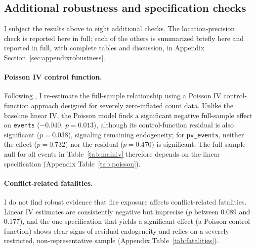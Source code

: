 \documentclass[12pt]{article}
\begin{document}
\subsection{Additional robustness and specification checks}
\label{sec:robustness-summary}

I subject the results above to eight additional checks. The location-precision check is reported here in full; each of the others is summarized briefly here and reported in full, with complete tables and discussion, in Appendix Section~\ref{sec:appendixrobustness}.

\paragraph{Poisson IV control function.} Following \citet{lu2023fish}, I re-estimate the full-sample relationship using a Poisson IV control-function approach \citep{terzabasurathouz2008} designed for severely zero-inflated count data. Unlike the baseline linear IV, the Poisson model finds a significant negative full-sample effect on \texttt{events} ($-0.040$, $p=0.013$), although its control-function residual is also significant ($p=0.038$), signaling remaining endogeneity; for \texttt{pv\_events}, neither the effect ($p=0.732$) nor the residual ($p=0.470$) is significant. The full-sample null for all events in Table~\ref{tab:mainiv} therefore depends on the linear specification (Appendix Table~\ref{tab:poisson}).

\paragraph{Conflict-related fatalities.} I do not find robust evidence that fire exposure affects conflict-related fatalities. Linear IV estimates are consistently negative but imprecise ($p$ between 0.089 and 0.177), and the one specification that yields a significant effect (a Poisson control function) shows clear signs of residual endogeneity and relies on a severely restricted, non-representative sample (Appendix Table~\ref{tab:fatalities}).
\end{document}
